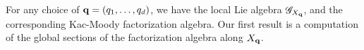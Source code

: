 
For any choice of ${\bf q} = (q_1,\ldots,q_d)$, we have the local Lie algebra $\mathscr G_{X_{\bf q}}$, and the corresponding Kac-Moody factorization algebra.
Our first result is a computation of the global sections of the factorization algebra along $X_{\bf q}$. 

